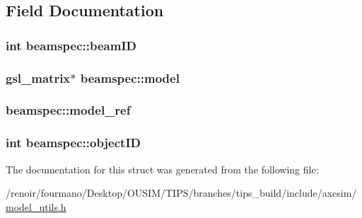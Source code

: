\subsection{Field Documentation}
\hypertarget{structbeamspec_a8185e83f23ffbab21ec47ec3d2bea13c}{
\subsubsection[{beamID}]{\setlength{\rightskip}{0pt plus 5cm}int {\bf beamspec::beamID}}}
\label{structbeamspec_a8185e83f23ffbab21ec47ec3d2bea13c}
\hypertarget{structbeamspec_a5585f5d3885305e980e09fed9a79a618}{
\subsubsection[{model}]{\setlength{\rightskip}{0pt plus 5cm}gsl\_\-matrix$\ast$ {\bf beamspec::model}}}
\label{structbeamspec_a5585f5d3885305e980e09fed9a79a618}
\hypertarget{structbeamspec_a4526cf634c09ad9fbd3f566dba8ea0fd}{
\subsubsection[{model\_\-ref}]{ {\bf beamspec::model\_\-ref}}}
\label{structbeamspec_a4526cf634c09ad9fbd3f566dba8ea0fd}
\hypertarget{structbeamspec_ac47c161554a61fa65c4f5a744f761252}{
\subsubsection[{objectID}]{\setlength{\rightskip}{0pt plus 5cm}int {\bf beamspec::objectID}}}
\label{structbeamspec_ac47c161554a61fa65c4f5a744f761252}


The documentation for this struct was generated from the following file:\begin{DoxyCompactItemize}
\item 
/renoir/fourmano/Desktop/OUSIM/TIPS/branches/tips\_\-build/include/axesim/\hyperlink{model__utils_8h}{model\_\-utils.h}\end{DoxyCompactItemize}
